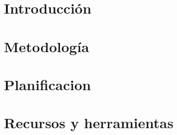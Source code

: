 \section{Introducción}


\section{Metodología}


\section{Planificacion}


\newpage
\section{Recursos y herramientas}

